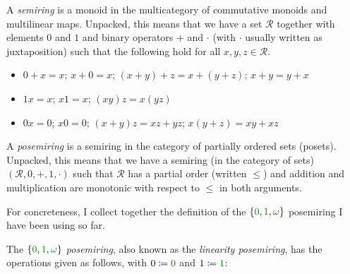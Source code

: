 \begin{definition}
  A \emph{semiring} is a monoid in the multicategory of commutative monoids and
  multilinear maps.
  Unpacked, this means that we have a set $\mathscr R$ together with elements
  $0$ and $1$ and binary operators $+$ and $\cdot$ (with $\cdot$ usually written
  as juxtaposition) such that the following hold for all
  $x, y, z \in \mathscr R$.
  \begin{itemize}
    \item $0 + x = x$; $x + 0 = x$; $(x + y) + z = x + (y + z)$; $x + y = y + x$
    \item $1x = x$; $x1 = x$; $(xy)z = x(yz)$
    \item $0x = 0$; $x0 = 0$; $(x + y)z = xz + yz$; $x(y + z) = xy + xz$
  \end{itemize}
\end{definition}
\begin{definition}
  A \emph{posemiring} is a semiring in the category of partially ordered sets
  (posets).
  Unpacked, this means that we have a semiring (in the category of sets)
  $(\mathscr R, 0, +, 1, \cdot)$ such that $\mathscr R$ has a partial order
  (written $\leq$) and addition and multiplication are monotonic with respect
  to $\leq$ in both arguments.
\end{definition}

For concreteness, I collect together the definition of the
$\{\gr0, \gr1, \gr\omega\}$ posemiring I have been using so far.

\begin{example}\label{def:lin-semiring}
  The \emph{$\{\gr0, \gr1, \gr\omega\}$ posemiring}, also known as the
  \emph{linearity posemiring}, has the operations given as follows, with
  $0 \coloneqq \gr0$ and $1 \coloneqq \gr1$:

\end{example}

